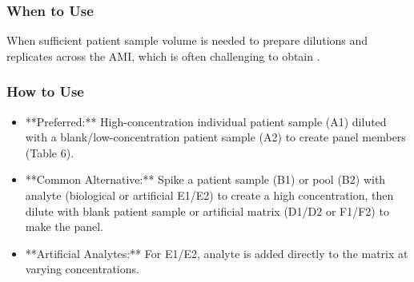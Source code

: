 \documentclass{article}
\begin{document}
\subsubsection{When to Use}
When sufficient patient sample volume is needed to prepare dilutions and replicates across the AMI, which is often challenging to obtain \cite{CLSIEP06}.

\subsubsection{How to Use}
\begin{itemize}
    \item **Preferred:** High-concentration individual patient sample (A1) diluted with a blank/low-concentration patient sample (A2) to create panel members (Table 6).
    \item **Common Alternative:** Spike a patient sample (B1) or pool (B2) with analyte (biological or artificial E1/E2) to create a high concentration, then dilute with blank patient sample or artificial matrix (D1/D2 or F1/F2) to make the panel.
    \item **Artificial Analytes:** For E1/E2, analyte is added directly to the matrix at varying concentrations.
\end{itemize}
\end{document}
